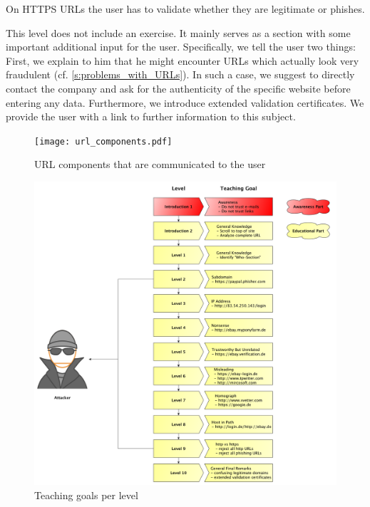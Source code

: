 \begin{description}[leftmargin=0cm]
On HTTPS URLs the user has to validate whether they are legitimate or phishes.
	\item[Level 10:] This level does not include an exercise.
 It mainly serves as a section with some important additional input for the user.
 Specifically, we tell the user two things: First, we explain to him that he might encounter URLs which actually look very fraudulent (cf. \autoref{s:problems_with_URLs}).
 In such a case, we suggest to directly contact the company and ask for the authenticity of the specific website before entering any data.
 Furthermore, we introduce extended validation certificates.
 We provide the user with a link to further information to this subject.
\end{description}

\begin{figure}[hHtbp]
\centering
\texttt{[image: url\_components.pdf]}
\caption{URL components that are communicated to the user}
\label{fig:url_components}
\end{figure}

\begin{figure}[hHtbp]
\centering
\includegraphics[width=1.0\textwidth]{graphix/level_teaching_goals.pdf}
\caption{Teaching goals per level}
\label{fig:level_teaching_goals}
\end{figure}


